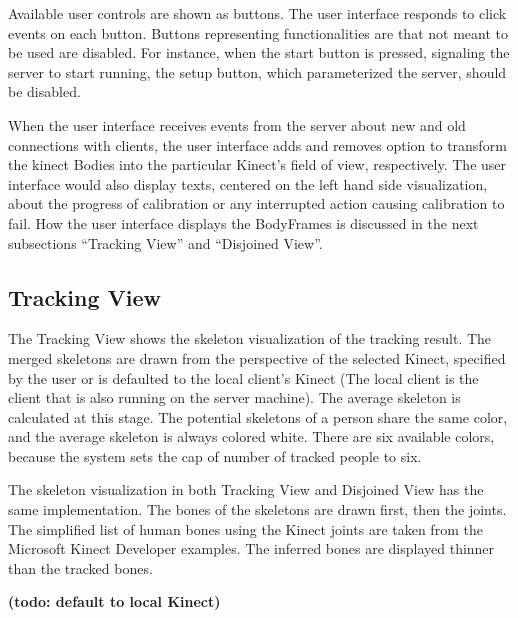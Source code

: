 Available user controls are shown as buttons. The user interface responds to click events on each button. Buttons representing functionalities are that not meant to be used are disabled. For instance, when the start button is pressed, signaling the server to start running, the setup button, which parameterized the server, should be disabled.

When the user interface receives events from the server about new and old connections with clients, the user interface adds and removes option to transform the kinect Bodies into the particular Kinect's field of view, respectively. The user interface would also display texts, centered on the left hand side visualization, about the progress of calibration or any interrupted action causing calibration to fail. How the user interface displays the BodyFrames is discussed in the next subsections ``Tracking View'' and ``Disjoined View''.

\subsection{Tracking View}
\label{sec:implementation_tracking_view}

The Tracking View shows the skeleton visualization of the tracking result. The merged skeletons are drawn from the perspective of the selected Kinect, specified by the user or is defaulted to the local client's Kinect (The local client is the client that is also running on the server machine). The average skeleton is calculated at this stage. The potential skeletons of a person share the same color, and the average skeleton is always colored white. There are six available colors, because the system sets the cap of number of tracked people to six.

The skeleton visualization in both Tracking View and Disjoined View has the same implementation. The bones of the skeletons are drawn first, then the joints. The simplified list of human bones using the Kinect joints are taken from the Microsoft Kinect Developer examples. The inferred bones are displayed thinner than the tracked bones.

\textbf{(todo: default to local Kinect)}


